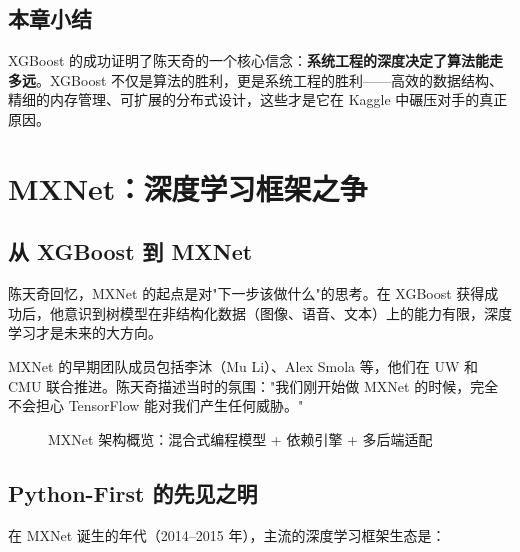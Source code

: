 \documentclass[a4paper]{article}
\begin{document}
\subsection{本章小结}

XGBoost 的成功证明了陈天奇的一个核心信念：\textbf{系统工程的深度决定了算法能走多远}。XGBoost 不仅是算法的胜利，更是系统工程的胜利——高效的数据结构、精细的内存管理、可扩展的分布式设计，这些才是它在 Kaggle 中碾压对手的真正原因。

\section{MXNet：深度学习框架之争}

\subsection{从 XGBoost 到 MXNet}

陈天奇回忆，MXNet 的起点是对"下一步该做什么"的思考。在 XGBoost 获得成功后，他意识到树模型在非结构化数据（图像、语音、文本）上的能力有限，深度学习才是未来的大方向。

MXNet 的早期团队成员包括李沐（Mu Li）、Alex Smola 等，他们在 UW 和 CMU 联合推进。陈天奇描述当时的氛围："我们刚开始做 MXNet 的时候，完全不会担心 TensorFlow 能对我们产生任何威胁。"

\begin{figure}[H]
\centering
{}
\caption{MXNet 架构概览：混合式编程模型 + 依赖引擎 + 多后端适配}
\end{figure}

\subsection{Python-First 的先见之明}

在 MXNet 诞生的年代（2014--2015 年），主流的深度学习框架生态是：
\end{document}
